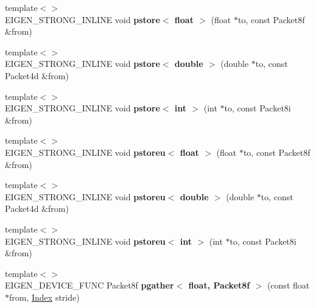 \begin{DoxyCompactItemize}
{\footnotesize template$<$$>$ }\\E\+I\+G\+E\+N\+\_\+\+S\+T\+R\+O\+N\+G\+\_\+\+I\+N\+L\+I\+NE void {\bfseries pstore$<$ float $>$} (float $\ast$to, const Packet8f \&from)
\item 
\mbox{\label{namespace_eigen_1_1internal_a71a6dd9408304503929ba8f15b6b01e1}} 
{\footnotesize template$<$$>$ }\\E\+I\+G\+E\+N\+\_\+\+S\+T\+R\+O\+N\+G\+\_\+\+I\+N\+L\+I\+NE void {\bfseries pstore$<$ double $>$} (double $\ast$to, const Packet4d \&from)
\item 
\mbox{\label{namespace_eigen_1_1internal_a15e7c38bcae065243057801ee78ec54d}} 
{\footnotesize template$<$$>$ }\\E\+I\+G\+E\+N\+\_\+\+S\+T\+R\+O\+N\+G\+\_\+\+I\+N\+L\+I\+NE void {\bfseries pstore$<$ int $>$} (int $\ast$to, const Packet8i \&from)
\item 
\mbox{\label{namespace_eigen_1_1internal_a77438beeed7bee0659c48352a1810220}} 
{\footnotesize template$<$$>$ }\\E\+I\+G\+E\+N\+\_\+\+S\+T\+R\+O\+N\+G\+\_\+\+I\+N\+L\+I\+NE void {\bfseries pstoreu$<$ float $>$} (float $\ast$to, const Packet8f \&from)
\item 
\mbox{\label{namespace_eigen_1_1internal_a07760f1b91fc3f036e4023402135fd76}} 
{\footnotesize template$<$$>$ }\\E\+I\+G\+E\+N\+\_\+\+S\+T\+R\+O\+N\+G\+\_\+\+I\+N\+L\+I\+NE void {\bfseries pstoreu$<$ double $>$} (double $\ast$to, const Packet4d \&from)
\item 
\mbox{\label{namespace_eigen_1_1internal_ac4685f2c9f93aeada51244c105111cc6}} 
{\footnotesize template$<$$>$ }\\E\+I\+G\+E\+N\+\_\+\+S\+T\+R\+O\+N\+G\+\_\+\+I\+N\+L\+I\+NE void {\bfseries pstoreu$<$ int $>$} (int $\ast$to, const Packet8i \&from)
\item 
\mbox{\label{namespace_eigen_1_1internal_ad3ece0545508527a7f9eb0a38fb4ec93}} 
{\footnotesize template$<$$>$ }\\E\+I\+G\+E\+N\+\_\+\+D\+E\+V\+I\+C\+E\+\_\+\+F\+U\+NC Packet8f {\bfseries pgather$<$ float, Packet8f $>$} (const float $\ast$from, \hyperlink{namespace_eigen_a62e77e0933482dafde8fe197d9a2cfde}{Index} stride)

\end{DoxyCompactItemize}
